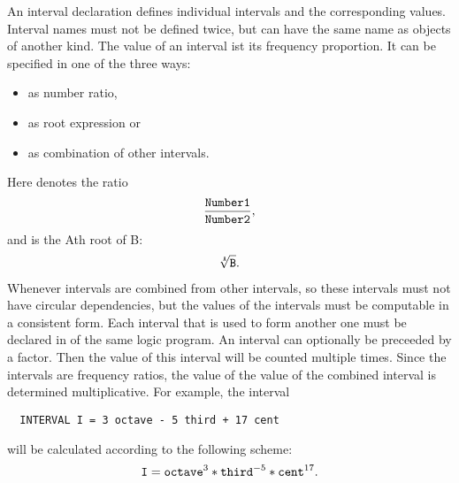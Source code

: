 An interval declaration defines individual intervals and the
corresponding values. Interval names must not be defined twice, but
can have the same name as objects of another kind. The value of an
interval ist its frequency proportion. It can be specified in one of
the three ways:
\begin{itemize}
\item as number ratio,
\item as root expression or
\item as combination of other intervals.
\end{itemize}
\iffalse
Eine Intervalldeklaration definiert einzelne Intervalle und die
dazugehörenden Werte. Intervallnamen dürfen nicht doppelt definiert
werden, sie dürfen jedoch gleiche Namen tragen,
wie Objekte einer anderen Art.
Der Wert eines Intervalls ist ein Frequenzverhältnis.
Der Wert eines Intervalls kann auf eine von drei Arten angegeben werden:
\bi
  \item als Zahlenverhältnis,
  \item als Wurzelausdruck\index{Wurzel} oder
  \item als Kombination aus anderen Intervallen.
\ei
\fi
Here  denotes the ratio
\begin{align*}
\frac{\text{\texttt{Number1}}}{\text{\texttt{Number2}}},
\end{align*}
and  is  the \keyword
Ath root of \keyword B:
\begin{align*}
  \sqrt[\text{\texttt{A}}]{\text{\texttt{B}}}.
\end{align*}
Whenever intervals are combined from other intervals, so these
intervals must not have circular dependencies, but the values of the
intervals must be computable in a consistent form. Each interval that
is used to form another one must be declared in of the same logic
program. An interval can optionally be preceeded by a
factor. Then the value of this interval will be counted
multiple times. Since the intervals are frequency ratios, the value of
the value of the combined interval is determined multiplicative. For
example, the interval 
\begin{lstlisting}
  INTERVAL I = 3 octave - 5 third + 17 cent
\end{lstlisting}
will be calculated according to the following scheme:
\begin{align*}
  \mathtt I = \texttt{octave}^3 * \texttt{third}^{-5} * \texttt{cent}^{17}.
\end{align*}
